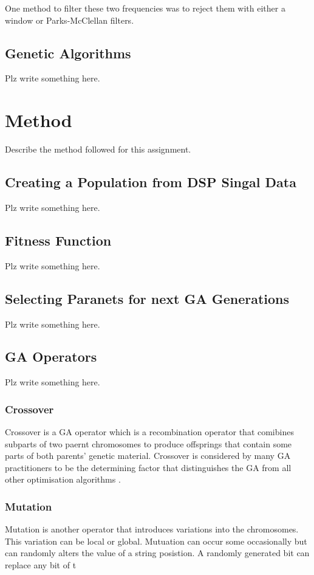\documentclass[a4paper, 11pt]{article}
\begin{document}
        One method to filter these two frequencies was to reject them with either a window or Parks-McClellan filters.
        
    \subsection{Genetic Algorithms}\label{sec:bg_sub2}
        Plz write something here.

\section{Method}\label{sec:meth}
    Describe the method followed for this assignment.

    \subsection{Creating a Population from DSP Singal Data}\label{sec:meth_sub1}
        Plz write something here.

    \subsection{Fitness Function}\label{sec:meth_sub2}
        Plz write something here.

    \subsection{Selecting Paranets for next GA Generations}\label{sec:meth_sub3}
        Plz write something here.

    \subsection{GA Operators}\label{sec:meth_sub4}
        Plz write something here.

        \subsubsection{Crossover}
            Crossover is a GA operator which is a recombination operator that comibines subparts of two paernt 
            chromosomes to produce offsprings that contain some parts of both parents' genetic material. Crossover
            is considered by many GA practitioners to be the determining factor that distinguishes the GA from
            all other optimisation algorithms \cite{Tang1996}.

        \subsubsection{Mutation}
            Mutation is another operator that introduces variations into the chromosomes. This variation can be
            local or global. Mutuation can occur some occasionally but can randomly alters the value of a string
            posistion. A randomly generated bit can replace any bit of t
\end{document}
